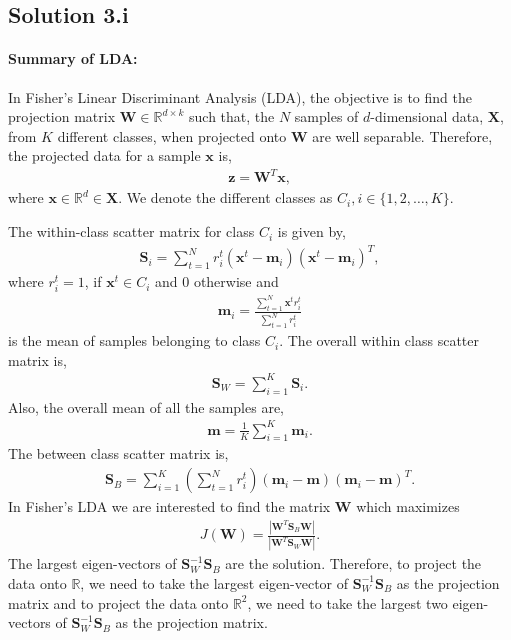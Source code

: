 \subsection*{Solution 3.i}
\paragraph{Summary of LDA:}In Fisher's Linear Discriminant Analysis (LDA), the objective is to find the projection matrix $\boldsymbol{W} \in \mathbb{R}^{d \times k}$ such that, the $N$ samples of $d$-dimensional data, $\boldsymbol{X}$, from $K$ different classes, when projected onto $\boldsymbol{W}$ are well separable. Therefore, the projected data for a sample $\boldsymbol{x}$ is,
\begin{align*}
	\boldsymbol{z} = \boldsymbol{W}^T\boldsymbol{x},
\end{align*}
where $\boldsymbol{x} \in \mathbb{R}^{d} \in \boldsymbol{X}$. We denote the different classes as $C_i, i \in \{1,2,\ldots,K\}$.

The within-class scatter matrix for class $C_i$ is given by,
\begin{align*}
	\boldsymbol{S}_i = \sum_{t=1}^{N} r_i^t (\boldsymbol{x}^t-\boldsymbol{m}_i)(\boldsymbol{x}^t-\boldsymbol{m}_i)^T,
\end{align*}
where $r_i^t = 1$, if $\boldsymbol{x}^t \in C_i$ and $0$ otherwise and
\begin{align*}
	\boldsymbol{m}_i = \frac{\sum_{t=1}^N \boldsymbol{x}^t r_i^t}{\sum_{t=1}^N r_i^t}
\end{align*}
is the mean of samples belonging to class $C_i$. The overall within class scatter matrix is,
\begin{align*}
	\boldsymbol{S}_W = \sum_{i=1}^K \boldsymbol{S}_i.
\end{align*}
Also, the overall mean of all the samples are,
\begin{align*}
	\boldsymbol{m} = \frac{1}{K} \sum_{i=1}^K \boldsymbol{m}_i.
\end{align*}
The between class scatter matrix is,
\begin{align*}
	\boldsymbol{S}_B = \sum_{i=1}^K \left(\sum_{t=1}^N r_i^t\right)(\boldsymbol{m}_i-\boldsymbol{m})(\boldsymbol{m}_i-\boldsymbol{m})^T.
\end{align*}
In Fisher's LDA we are interested to find the matrix $\boldsymbol{W}$ which maximizes
\begin{align*}
	J(\boldsymbol{W}) = \frac{|\boldsymbol{W}^T\boldsymbol{S}_B \boldsymbol{W}|}{|\boldsymbol{W}^T \boldsymbol{S}_W \boldsymbol{W}|}.
\end{align*}
The largest eigen-vectors of $\boldsymbol{S}_W^{-1}\boldsymbol{S}_B$ are the solution. Therefore, to project the data onto $\mathbb{R}$, we need to take the largest eigen-vector of $\boldsymbol{S}_W^{-1}\boldsymbol{S}_B$ as the projection matrix and to project the data onto $\mathbb{R}^2$, we need to take the largest two eigen-vectors of $\boldsymbol{S}_W^{-1}\boldsymbol{S}_B$ as the projection matrix.

